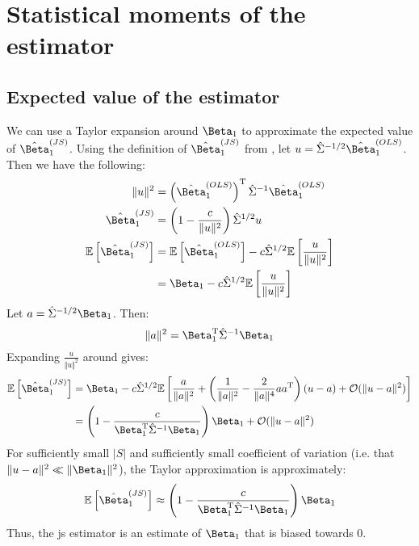 \section{Statistical moments of the  estimator}
\label{sec:JS_moments}

\subsection{Expected value of the  estimator}

We can use a Taylor expansion around $\Beta_1$ to approximate the expected value of $\hat{\Beta}_1^{(JS)}$.
Using the definition of $\hat{\Beta}_1^{(JS)}$ from , let $u = \hat{\Sigma}^{-1/2}\hat{\Beta}_1^{(OLS)}$.
Then we have the following:
%
\begin{align}
  \Vert u \Vert ^2                & = \left( \hat{\Beta}_1^{(OLS)} \right) ^\tran \hat{\Sigma}^{-1} \hat{\Beta}_1^{(OLS)}          \\
  \hat{\Beta}_1^{(JS)}            & = \left( 1 - \frac{c}{\Vert u \Vert ^2} \right) \hat{\Sigma}^{1/2} u                           \\
  \expect{ \hat{\Beta}_1^{(JS)} } & = \expect{ \hat{\Beta}_1^{(OLS)} } - c\hat{\Sigma}^{1/2} \expect{ \frac{u}{\Vert u \Vert ^2} } \\
                                  & = \Beta_1 - c\hat{\Sigma}^{1/2}\expect{ \frac{u}{\Vert u \Vert ^2} }
\end{align}
%
Let $a = \hat{\Sigma}^{-1/2}\Beta_1$.
Then:
\begin{equation}
  \Vert a \Vert ^2 = \Beta_1^\tran \hat{\Sigma}^{-1} \Beta_1
\end{equation}
%
Expanding $\frac{u}{\Vert u \Vert ^2}$ around gives:
%
\begin{align}
  \expect{ \hat{\Beta}_1^{(JS)} }
   & = \Beta_1 - c\hat{\Sigma}^{1/2}\expect{
    \frac{a}{\Vert a \Vert ^2}
    + \left( \frac{1}{\Vert a \Vert ^2} - \frac{2}{\Vert a \Vert ^4} aa^\tran \right)(u - a)
    + \mathcal{O}(\Vert u - a \Vert ^2)
  }                                                                                \\
   & = \left(1 - \frac{c}{\Beta_1^\tran \hat{\Sigma}^{-1} \Beta_1} \right) \Beta_1
  + \mathcal{O}(\Vert u - a \Vert ^2)
\end{align}
%
For sufficiently small $|S|$ and sufficiently small coefficient of variation (i.e. that $\Vert u - a \Vert ^2 \ll \Vert \Beta_1 \Vert ^2$), the Taylor approximation is approximately:
%
\begin{equation}
  \expect{ \hat{\Beta}_1^{(JS)} } \approx \left(1 - \frac{c}{\Beta_1^\tran \hat{\Sigma}^{-1} \Beta_1} \right) \Beta_1
\end{equation}
%
Thus, the \gls{js} estimator is an estimate of $\Beta_1$ that is biased towards 0.

